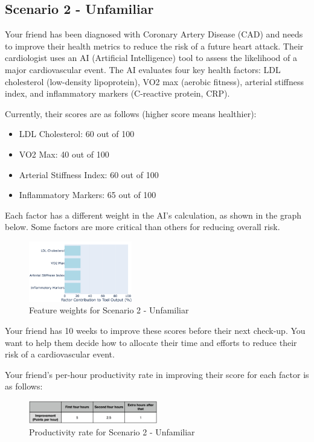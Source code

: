 \subsection{Scenario 2 - Unfamiliar}
Your friend has been diagnosed with Coronary Artery Disease (CAD) and needs to improve their health metrics to reduce the risk of a future heart attack. Their cardiologist uses an AI (Artificial Intelligence) tool to assess the likelihood of a major cardiovascular event. The AI evaluates four key health factors: LDL cholesterol (low-density lipoprotein), VO2 max (aerobic fitness), arterial stiffness index, and inflammatory markers (C-reactive protein, CRP).

Currently, their scores are as follows (higher score means healthier):
\begin{itemize}
    \item LDL Cholesterol: 60 out of 100
    \item VO2 Max: 40 out of 100
    \item Arterial Stiffness Index: 60 out of 100
    \item Inflammatory Markers: 65 out of 100
\end{itemize}

Each factor has a different weight in the AI’s calculation, as shown in the graph below. Some factors are more critical than others for reducing overall risk.
\begin{figure}[ht]
    \centering
    \includegraphics[width=0.4\textwidth]{Figures/4_unf_bal.png}
    \caption{Feature weights for Scenario 2 - Unfamiliar}
    \label{fig:survey-weights-scenario2-unf}
\end{figure}

Your friend has 10 weeks to improve these scores before their next check-up. You want to help them decide how to allocate their time and efforts to reduce their risk of a cardiovascular event.

Your friend’s per-hour productivity rate in improving their score for each factor is as follows:

\begin{figure}[ht]
    \centering
    \includegraphics[width=0.5\textwidth]{Figures/rate-unf.png}
    \caption{Productivity rate for Scenario 2 - Unfamiliar}
    \label{fig:survey-cost-scenario2-unf}
\end{figure}

